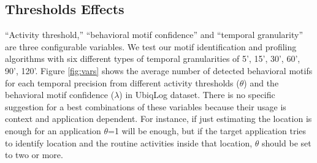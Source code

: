 \documentclass{sig-alternate}
\begin{document}
\subsection{Thresholds Effects} \label{teffect}
``Activity threshold,'' ``behavioral motif confidence'' and ``temporal granularity'' are three configurable variables. We test our motif identification and profiling algorithms with six different types of temporal granularities of 5', 15', 30', 60', 90', 120'. Figure \ref{fig:vars} shows the average number of detected behavioral motifs for each temporal precision from different activity thresholds ($\theta$) and the behavioral motif confidence ($\lambda$) in UbiqLog dataset. There is no specific suggestion for a best combinations of these variables because their usage is context and application dependent. For instance, if just estimating the location is enough for an application $\theta$=1 will be enough, but if the target application tries to identify location and the routine activities inside that location, $\theta$ should be set to two or more. \\
\begin{figure*}[ht]
\begin{floatrow}
\CenterFloatBoxes
{}
\end{floatrow}
\vspace{-0.2cm}
\end{figure*}
\end{document}
